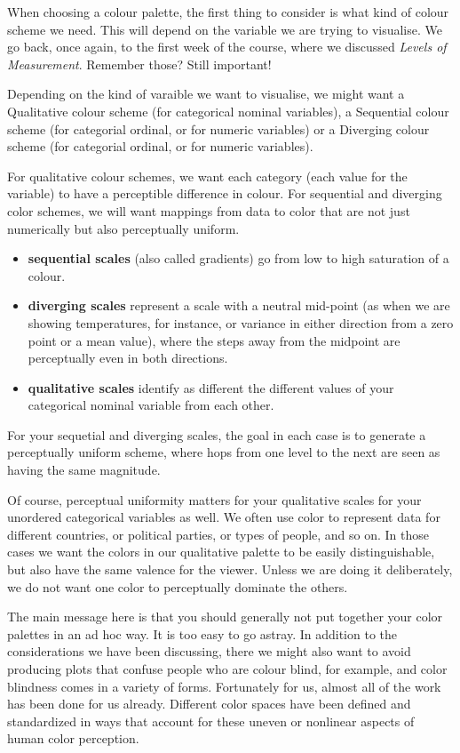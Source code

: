 \documentclass[
  krantz2]{krantz}
\providecommand{\tightlist}{%
  \setlength{\itemsep}{0pt}\setlength{\parskip}{0pt}}
\begin{document}
When choosing a colour palette, the first thing to consider is what kind of colour scheme we need. This will depend on the variable we are trying to visualise. We go back, once again, to the first week of the course, where we discussed \emph{Levels of Measurement}. Remember those? Still important!

Depending on the kind of varaible we want to visualise, we might want a Qualitative colour scheme (for categorical nominal variables), a Sequential colour scheme (for categorial ordinal, or for numeric variables) or a Diverging colour scheme (for categorial ordinal, or for numeric variables).

For qualitative colour schemes, we want each category (each value for the variable) to have a perceptible difference in colour. For sequential and diverging color schemes, we will want mappings from data to color that are not just numerically but also perceptually uniform.

\begin{itemize}
\tightlist
\item
  \textbf{sequential scales} (also called gradients) go from low to high saturation of a colour.
\item
  \textbf{diverging scales} represent a scale with a neutral mid-point (as when we are showing temperatures, for instance, or variance in either direction from a zero point or a mean value), where the steps away from the midpoint are perceptually even in both directions.
\item
  \textbf{qualitative scales} identify as different the different values of your categorical nominal variable from each other.
\end{itemize}

For your sequetial and diverging scales, the goal in each case is to generate a perceptually uniform scheme, where hops from one level to the next are seen as having the same magnitude.

Of course, perceptual uniformity matters for your qualitative scales for your unordered categorical variables as well. We often use color to represent data for different countries, or political parties, or types of people, and so on. In those cases we want the colors in our qualitative palette to be easily distinguishable, but also have the same valence for the viewer. Unless we are doing it deliberately, we do not want one color to perceptually dominate the others.

The main message here is that you should generally not put together your color palettes in an ad hoc way. It is too easy to go astray. In addition to the considerations we have been discussing, there we might also want to avoid producing plots that confuse people who are colour blind, for example, and color blindness comes in a variety of forms. Fortunately for us, almost all of the work has been done for us already. Different color spaces have been defined and standardized in ways that account for these uneven or nonlinear aspects of human color perception.
\end{document}
